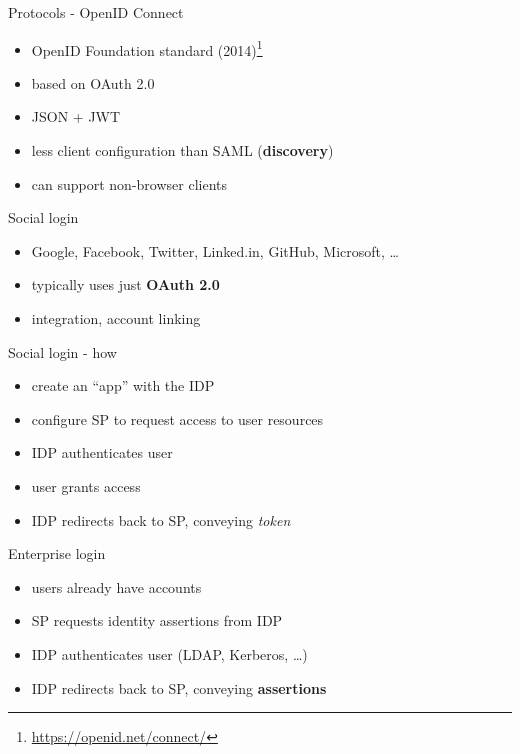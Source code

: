 \documentclass[ignorenonframetext,aspectratio=169]{beamer}
\providecommand{\tightlist}{%
  \setlength{\itemsep}{0pt}\setlength{\parskip}{0pt}}
\begin{document}
\begin{frame}{Protocols - OpenID Connect}

\begin{itemize}
\tightlist
\item OpenID Foundation standard (2014)\footnote{
        \url{https://openid.net/connect/}}
\item based on OAuth 2.0
\item JSON + JWT
\item less client configuration than SAML ({\bf discovery})
\item can support non-browser clients
\end{itemize}

\end{frame}

\begin{frame}{Social login}

\begin{itemize}
\tightlist
\item
  Google, Facebook, Twitter, Linked.in, GitHub, Microsoft, \ldots{}
\item
  typically uses just \textbf{OAuth 2.0}
\item
  integration, account linking
\end{itemize}

\end{frame}

\begin{frame}{Social login - how}

\begin{itemize}
\tightlist
\item
  create an ``app'' with the IDP
\item
  configure SP to request access to user resources
\item
  IDP authenticates user
\item
  user grants access
\item
  IDP redirects back to SP, conveying \emph{token}
\end{itemize}

\end{frame}

\begin{frame}{Enterprise login}

\begin{itemize}
\tightlist
\item
  users already have accounts
\item
  SP requests identity assertions from IDP
\item
  IDP authenticates user (LDAP, Kerberos, \ldots{})
\item
  IDP redirects back to SP, conveying \textbf{assertions}
\end{itemize}

\end{frame}
\end{document}
